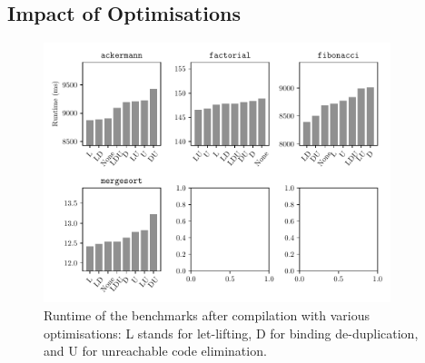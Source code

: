 \documentclass[dissertation.tex]{subfiles}
\begin{document}
{    \subsection{Impact of Optimisations}
    {

        \begin{figure}[H]
            \centering
            \captionsetup{width=0.8\textwidth}
            \includegraphics[width=0.9\textwidth]{graphs/perf_by_opt.pdf}
            \caption{Runtime of the benchmarks after compilation with various optimisations: L stands for let-lifting, D for binding de-duplication, and U for unreachable code elimination.}
            \label{fig:opt-perf}
        \end{figure}
    }
}
\end{document}
